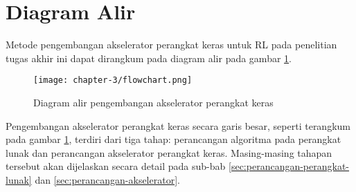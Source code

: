 \section{Diagram Alir}

Metode pengembangan akselerator perangkat keras untuk \ac{RL} pada penelitian tugas akhir ini dapat dirangkum pada diagram alir pada gambar \ref{fig:flowchart-pengembangan}.

\begin{figure}[h]
	\centering
	\texttt{[image: chapter-3/flowchart.png]}
	\caption{Diagram alir pengembangan akselerator perangkat keras}
	\label{fig:flowchart-pengembangan}
\end{figure}

Pengembangan akselerator perangkat keras secara garis besar, seperti terangkum pada gambar \ref{fig:flowchart-pengembangan}, terdiri dari tiga tahap: perancangan algoritma pada perangkat lunak dan perancangan akselerator perangkat keras. Masing-masing tahapan tersebut akan dijelaskan secara detail pada sub-bab \ref{sec:perancangan-perangkat-lunak} dan \ref{sec:perancangan-akselerator}.
